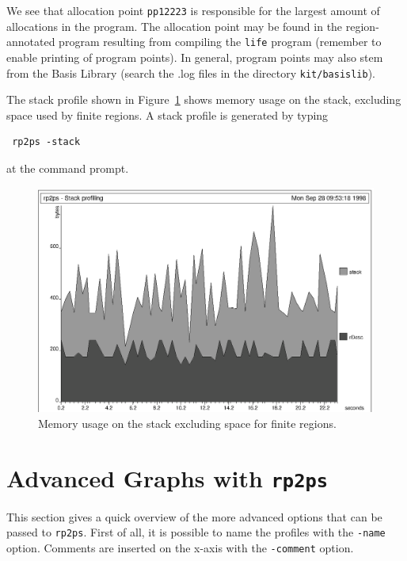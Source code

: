 \documentclass[12pt]{book}
\begin{document}
We see that allocation point \texttt{pp12223} is responsible for the
largest amount of allocations in the program. The allocation point may
be found in the region-annotated program resulting from compiling the
{\tt life} program (remember to enable printing of program points). In
general, program points may also stem from the Basis Library (search
the {.log} files in the directory {\tt kit/basislib}).

The stack profile shown in Figure~\ref{prof_eks3.fig} shows memory
usage on the stack, excluding space used by finite regions. A 
%
%
stack profile is generated by typing
\begin{verbatim}
 rp2ps -stack
\end{verbatim}
at the command prompt.

\begin{figure}
\begin{center}
\includegraphics{prof_eks3.ps}
\end{center}
\caption{Memory usage on the stack excluding space for finite regions.}
\label{prof_eks3.fig}
\end{figure}

\section{Advanced Graphs with \texttt{rp2ps}}
This section gives a quick overview of the more advanced options that can
be passed to \texttt{rp2ps}. First of all, it is possible to name the
profiles with the 
%
{\tt -name} option. Comments are inserted on the
x-axis with the 
%
{\tt -comment} option.
\end{document}
